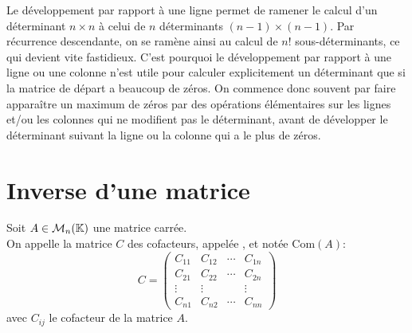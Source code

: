 \documentclass{book}
\begin{document}
\begin{Remarque}
Le développement par rapport à une ligne permet de ramener
le calcul d'un déterminant $n\times n$ à celui de $n$ déterminants
$(n-1)\times(n-1)$. Par récurrence descendante, on se ramène
ainsi au calcul de $n!$ sous-déterminants, ce qui devient vite fastidieux.
C'est pourquoi le développement par rapport à une ligne ou une
colonne  n'est utile pour calculer explicitement un déterminant que
si la matrice de départ a beaucoup de zéros.
On commence donc souvent par faire apparaître
un maximum de zéros par des opérations élémentaires sur les lignes et/ou les colonnes
qui ne modifient pas le déterminant,
avant de développer le déterminant suivant la ligne ou la colonne qui a le plus de zéros.
\end{Remarque}

\section{Inverse d'une matrice}


\begin{Definition}
Soit $A \in \mathcal{M}_{n}(\mathbb{K})$ une matrice carrée.\\
On appelle la matrice $C$ des cofacteurs, appelée , et notée
$\mathrm{Com}(A)$:
$$C =  \left(
\begin{array}{cccc}
C_{11} & C_{12} & \cdots & C_{1n}\\
C_{21} & C_{22} & \cdots & C_{2n}\\
\vdots & \vdots & & \vdots\\
C_{n1} & C_{n2} & \cdots & C_{nn}
\end{array}\right)
$$
avec $C_{ij}$ le cofacteur de la matrice $A$.
\end{Definition}
\end{document}
